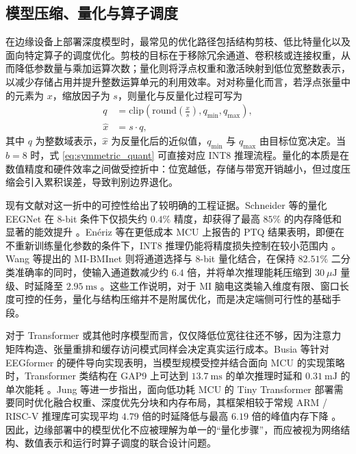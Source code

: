 \subsection{模型压缩、量化与算子调度}

在边缘设备上部署深度模型时，最常见的优化路径包括结构剪枝、低比特量化以及面向特定算子的调度优化。剪枝的目标在于移除冗余通道、卷积核或连接权重，从而降低参数量与乘加运算次数；量化则将浮点权重和激活映射到低位宽整数表示，以减少存储占用并提升整数运算单元的利用效率。对对称量化而言，若浮点张量中的元素为 $x$，缩放因子为 $s$，则量化与反量化过程可写为
\begin{equation}
\begin{aligned}
q &= \mathrm{clip}\!\left(\mathrm{round}\!\left(\frac{x}{s}\right), q_{\min}, q_{\max}\right), \\
\hat{x} &= s \cdot q,
\end{aligned}
\label{eq:symmetric_quant}
\end{equation}
其中 $q$ 为整数域表示，$\hat{x}$ 为反量化后的近似值，$q_{\min}$ 与 $q_{\max}$ 由目标位宽决定。当 $b=8$ 时，式 \eqref{eq:symmetric_quant} 可直接对应 INT8 推理流程。量化的本质是在数值精度和硬件效率之间做受控折中：位宽越低，存储与带宽开销越小，但过度压缩会引入累积误差，导致判别边界退化。

现有文献对这一折中的可控性给出了较明确的工程证据。Schneider 等的量化 EEGNet 在 8-bit 条件下仅损失约 $0.4\%$ 精度，却获得了最高 $85\%$ 的内存降低和显著的能效提升 \cite{Sch20}。En\'eriz 等在更低成本 MCU 上报告的 PTQ 结果表明，即便在不重新训练量化参数的条件下，INT8 推理仍能将精度损失控制在较小范围内 \cite{Ene23}。Wang 等提出的 MI-BMInet 则将通道选择与 8-bit 量化结合，在保持 $82.51\%$ 二分类准确率的同时，使输入通道数减少约 $6.4$ 倍，并将单次推理能耗压缩到 $30\ \mu\text{J}$ 量级、时延降至 $2.95\ \text{ms}$ \cite{Wan22b}。这些工作说明，对于 MI 脑电这类输入维度有限、窗口长度可控的任务，量化与结构压缩并不是附属优化，而是决定端侧可行性的基础手段。

对于 Transformer 或其他时序模型而言，仅仅降低位宽往往还不够，因为注意力矩阵构造、张量重排和缓存访问模式同样会决定真实运行成本。Busia 等针对 EEGformer 的硬件导向实现表明，当模型规模受控并结合面向 MCU 的实现策略时，Transformer 类结构在 GAP9 上可达到 $13.7\ \text{ms}$ 的单次推理时延和 $0.31\ \text{mJ}$ 的单次能耗 \cite{bus2024reducing}。Jung 等进一步指出，面向低功耗 MCU 的 Tiny Transformer 部署需要同时优化融合权重、深度优先分块和内存布局，其框架相较于常规 ARM / RISC-V 推理库可实现平均 $4.79$ 倍的时延降低与最高 $6.19$ 倍的峰值内存下降 \cite{Jun24}。因此，边缘部署中的模型优化不应被理解为单一的“量化步骤”，而应被视为网络结构、数值表示和运行时算子调度的联合设计问题。

